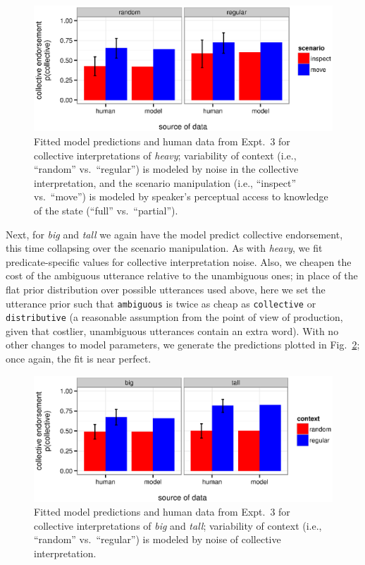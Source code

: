 \documentclass[linguex]{sp}
\begin{document}
\begin{figure}[h]
	\centering
	\includegraphics[width=\linewidth]{plots/heavymodel2.eps}
	\vspace{-20pt}
	\caption{Fitted model predictions and human data from Expt.~3 for collective interpretations of \emph{heavy}; variability of context (i.e., ``random'' vs.~``regular'') is modeled by noise in the collective interpretation, and the scenario manipulation (i.e., ``inspect'' vs.~``move'') is modeled by speaker's perceptual access to knowledge of the state (``full'' vs.~``partial'').} \label{heavymodel}
\end{figure}

Next, for \emph{big} and \emph{tall} we again have the model predict collective endorsement, this time collapsing over the scenario manipulation. As with \emph{heavy}, we fit predicate-specific values for collective interpretation noise. Also, we cheapen the cost of the ambiguous utterance relative to the unambiguous ones; in place of the flat prior distribution over possible utterances used above, here we set the utterance prior such that \texttt{ambiguous} is twice as cheap as \texttt{collective} or \texttt{distributive} (a reasonable assumption from the point of view of production, given that costlier, unambiguous utterances contain an extra word). With no other changes to model parameters, we generate the predictions plotted in Fig.~\ref{bigtallmodel}; once again, the fit is near perfect.

\begin{figure}[h]
	\centering
	\includegraphics[width=\linewidth]{plots/bigtallmodel2.eps}
	\vspace{-20pt}
	\caption{Fitted model predictions and human data from Expt.~3 for collective interpretations of \emph{big} and \emph{tall}; variability of context (i.e., ``random'' vs.~``regular'') is modeled by noise of collective interpretation.} \label{bigtallmodel}
\end{figure}
\end{document}
